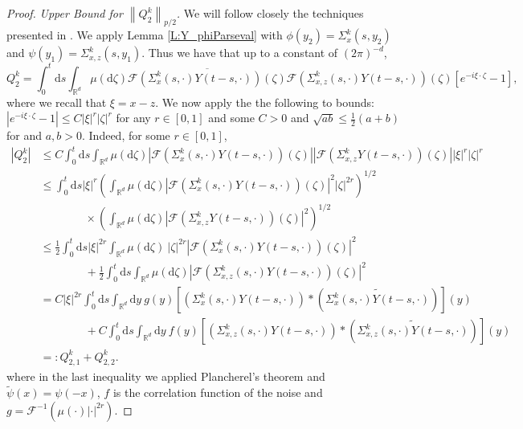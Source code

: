 \documentclass[a4paper,11pt]{article}
\numberwithin{equation}{section}
\theoremstyle{plain}
\theoremstyle{definition}
\newcommand{\ud}{\ensuremath{\mathrm{d} }}
\newcommand{\Norm}[1]{\left\|  #1   \right\|}
\newcommand{\R}{\mathbb{R}}
\numberwithin{NQ}{section}
\numberwithin{LQ}{section}
\numberwithin{ZQ}{section}
\begin{document}
\begin{proof}
  \textit{Upper Bound for $\Norm{Q_2^k}_{p/2}$.} We will follow closely the techniques presented in
  \cite[Theorem 3.2]{hu.huang.ea:16:on}. We apply Lemma \ref{L:Y_phiParseval} with $\phi(y_2) =
  \Sigma_{x}^k(s,y_2)$ and $\psi(y_1) = \Sigma_{x,z}^k(s,y_1)$. Thus we have that up to a constant
  of $(2\pi)^{-d}$,
	\[
	Q_2^k = \int_0^t \ud s \int_{\R^d} \mu(\ud \zeta) \overline{ \mathcal{F}\left( \Sigma_{x}^k(s,\cdot)Y(t-s,\cdot) \right)(\zeta) }\mathcal{F}\left(\Sigma^k_{x,z}(s, \cdot) Y(t-s,\cdot)\right)(\zeta)[e^{-i\xi \cdot \zeta}-1],
	\]
  where we recall that $\xi = x - z$. We now apply the the following to bounds: $|e^{-i\xi \cdot
  \zeta}-1| \le C |\xi|^{r} |\zeta|^{r}$ for any $r \in [0,1]$ and some $C>0$ and $\sqrt{ab} \le
  \frac{1}{2}(a+b)$ for and $a,b > 0$. Indeed, for some $r \in [0,1]$,
	\begin{align*}
	|Q_2^k| & \le C \int_0^t \ud s \int_{\R^d} \mu(\ud \zeta) \left| \mathcal{F}\left(\Sigma_{x}^k(s,\cdot)Y(t-s,\cdot)\right)(\zeta)\right| \left|\mathcal{F}\left(\Sigma^k_{x,z} Y(t-s,\cdot)\right)(\zeta)\right| |\xi|^{r} |\zeta|^{r} \\
          & \le \int_0^t \ud s |\xi|^{r} \left(\int_{\R^d} \mu(\ud \zeta) \left| \mathcal{F}\left(\Sigma_{x}^k(s,\cdot)Y(t-s,\cdot)\right)(\zeta)\right|^2 |\zeta|^{2r} \right)^{1/2}                                                    \\
          & \qquad \qquad \times \left( \int_{\R^d} \mu(\ud \zeta)\left|\mathcal{F}\left(\Sigma^k_{x,z} Y(t-s,\cdot)\right)(\zeta)\right|^2 \right)^{1/2}                                                                                \\
          & \le \frac{1}{2} \int_0^t \ud s |\xi|^{2r} \int_{\R^d} \mu(\ud \zeta) \: |\zeta|^{2r} \left| \mathcal{F}\left(\Sigma_{x}^k(s,\cdot)Y(t-s,\cdot)\right)(\zeta)\right|^2                                                        \\
          & \qquad \qquad + \frac{1}{2} \int_0^t \ud s\int_{\R^d} \mu(\ud \zeta)\left|\mathcal{F}\left(\Sigma^k_{x,z}(s,\cdot) Y(t-s,\cdot)\right)(\zeta)\right|^2                                                                       \\
          & = C |\xi|^{2r} \int_0^t \ud s \int_{\R^d} \ud y \: g(y) \left[\left(\Sigma^k_x(s,\cdot) Y(t-s,\cdot)\right)*\left(\widetilde{\Sigma^k_x(s,\cdot) Y(t-s,\cdot)}\right)\right](y)                                              \\
          & \qquad \qquad + C \int_0^t \ud s \int_{\R^d} \ud y \: f(y) \left[\left(\Sigma^k_{x,z}(s,\cdot) Y(t-s,\cdot)\right)*\left(\widetilde{\Sigma^k_{x,z}(s,\cdot) Y(t-s,\cdot)}\right)\right](y)                                   \\
          & =: Q^k_{2,1} + Q^k_{2,2}.
	\end{align*}
where in the last inequality we applied Plancherel's theorem and $\widetilde{\psi}(x) = \psi(-x)$,
$f$ is the correlation function of the noise and $g = \mathcal{F}^{-1} \left(\mu(\cdot) |\cdot|^{2r}
\right)$.


\end{proof}
\end{document}
